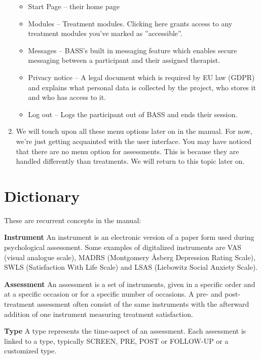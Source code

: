 \documentclass[]{book}
\providecommand{\tightlist}{%
  \setlength{\itemsep}{0pt}\setlength{\parskip}{0pt}}
\begin{document}
\begin{enumerate}
  \begin{itemize}
  \tightlist
  \item
    Start Page -- their home page
  \item
    Modules -- Treatment modules. Clicking here grants access to any treatment modules you've marked as ''accessible''.
  \item
    Messages -- BASS's built in messaging feature which enables secure messaging between a participant and their assigned therapist.
  \item
    Privacy notice -- A legal document which is required by EU law (GDPR) and explains what personal data is collected by the project, who stores it and who has access to it.
  \item
    Log out -- Logs the participant out of BASS and ends their session.
  \end{itemize}
\item
  We will touch upon all these menu options later on in the manual. For now, we're just getting acquainted with the user interface. You may have noticed that there are no menu option for assessments. This is because they are handled differently than treatments. We will return to this topic later on.
\end{enumerate}

\hypertarget{dictionary}{%
\chapter{Dictionary}\label{dictionary}}

These are recurrent concepts in the manual:

\textbf{Instrument}
An instrument is an electronic version of a paper form used during psychological assessment. Some examples of digitalized instruments are VAS (visual analogue scale), MADRS (Montgomery Åsberg Depression Rating Scale), SWLS (Satisfaction With Life Scale) and LSAS (Liebowitz Social Anxiety Scale).

\textbf{Assessment}
An assessment is a set of instruments, given in a specific order and at a specific occasion or for a specific number of occasions. A pre- and post-treatment assessment often consist of the same instruments with the afterward addition of one instrument measuring treatment satisfaction.

\textbf{Type}
A type represents the time-aspect of an assessment. Each assessment is linked to a type, typically SCREEN, PRE, POST or FOLLOW-UP or a customized type.
\end{document}
